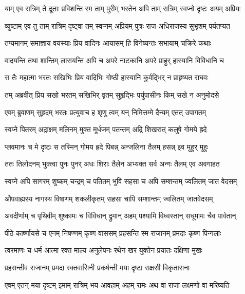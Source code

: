 
\twolineshloka
{याम् एव रात्रिम् ते दूताः प्रविशन्ति स्म ताम् पुरीम्}
{भरतेन अपि ताम् रात्रिम् स्वप्नो दृष्टः अयम् अप्रियः} %

\twolineshloka
{व्युष्टाम् एव तु ताम् रात्रिम् दृष्ट्वा तम् स्वप्नम् अप्रियम्}
{पुत्रः राज अधिराजस्य सुभृशम् पर्यतप्यत} %

\twolineshloka
{तप्यमानम् समाज्ञाय वयस्याः प्रिय वादिनः}
{आयासम् हि विनेष्यन्तः सभायाम् चक्रिरे कथाः} %

\twolineshloka
{वादयन्ति तथा शान्तिम् लासयन्ति अपि च अपरे}
{नाटकानि अपरे प्राहुर् हास्यानि विविधानि च} %

\twolineshloka
{स तैः महात्मा भरतः सखिभिः प्रिय वादिभिः}
{गोष्ठी हास्यानि कुर्वद्भिर् न प्राहृष्यत राघवः} %

\twolineshloka
{तम् अब्रवीत् प्रिय सखो भरतम् सखिभिर् वृतम्}
{सुहृद्भिः पर्युपासीनः किम् सखे न अनुमोदसे} %

\twolineshloka
{एवम् ब्रुवाणम् सुहृदम् भरतः प्रत्युवाच ह}
{शृणु त्वम् यन् निमित्तम्मे दैन्यम् एतत् उपागतम्} %

\twolineshloka
{स्वप्ने पितरम् अद्राक्षम् मलिनम् मुक्त मूर्धजम्}
{पतन्तम् अद्रि शिखरात् कलुषे गोमये ह्रदे} %

\twolineshloka
{प्लवमानः च मे दृष्टः स तस्मिन् गोमय ह्रदे}
{पिबन्न् अन्जलिना तैलम् हसन्न् इव मुहुर् मुहुः} %

\twolineshloka
{ततः तिलोदनम् भुक्त्वा पुनः पुनर् अधः शिराः}
{तैलेन अभ्यक्त सर्व अन्गः तैलम् एव अवगाहत} %

\twolineshloka
{स्वप्ने अपि सागरम् शुष्कम् चन्द्रम् च पतितम् भुवि}
{सहसा च अपि सम्शन्तम् ज्वलितम् जात वेदसम्} %

\twolineshloka
{औपवाह्यस्य नागस्य विषाणम् शकलीकृतम्}
{सहसा चापि सम्शान्तम् ज्वलितम् जातवेदसम्} %

\twolineshloka
{अवदीर्णाम् च पृथिवीम् शुष्कामः च विविधान् द्रुमान्}
{अहम् पश्यामि विध्वस्तान् सधूमामः चैव पार्वतान्} %

\twolineshloka
{पीठे कार्ष्णायसे च एनम् निषण्णम् कृष्ण वाससम्}
{प्रहसन्ति स्म राजानम् प्रमदाः कृष्ण पिन्गलाः} %

\twolineshloka
{त्वरमाणः च धर्म आत्मा रक्त माल्य अनुलेपनः}
{रथेन खर युक्तेन प्रयातः दक्षिणा मुखः} %

\twolineshloka
{प्रहसन्तीव राजानम् प्रमदा रक्तवासिनी}
{प्रकर्षन्ती मया दृष्टा राक्षसी विकृतासना} %

\twolineshloka
{एवम् एतन् मया दृष्टम् इमाम् रात्रिम् भय आवहाम्}
{अहम् रामः अथ वा राजा लक्ष्मणो वा मरिष्यति} %

